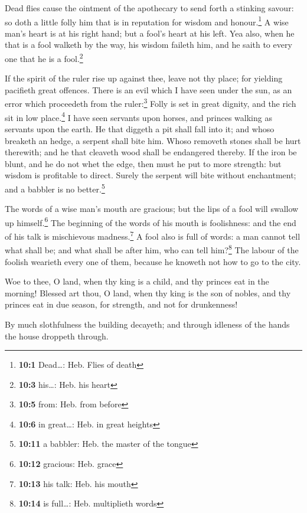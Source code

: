  Dead flies cause the ointment of the apothecary to send
forth a stinking savour: so doth a little folly him that is in
reputation for wisdom and honour.\footnote{\textbf{10:1} Dead\ldots:
  Heb. Flies of death}  A wise man's heart is at his right
hand; but a fool's heart at his left.  Yea also, when he
that is a fool walketh by the way, his wisdom faileth him, and he saith
to every one that he is a fool.\footnote{\textbf{10:3} his\ldots: Heb.
  his heart}

 If the spirit of the ruler rise up against thee, leave
not thy place; for yielding pacifieth great offences. 
There is an evil which I have seen under the sun, as an error which
proceedeth from the ruler:\footnote{\textbf{10:5} from: Heb. from before}
 Folly is set in great dignity, and the rich sit in low
place.\footnote{\textbf{10:6} in great\ldots: Heb. in great heights}
 I have seen servants upon horses, and princes walking as
servants upon the earth.  He that diggeth a pit shall fall
into it; and whoso breaketh an hedge, a serpent shall bite him.
 Whoso removeth stones shall be hurt therewith; and he
that cleaveth wood shall be endangered thereby.  If the
iron be blunt, and he do not whet the edge, then must he put to more
strength: but wisdom is profitable to direct.  Surely the
serpent will bite without enchantment; and a babbler is no
better.\footnote{\textbf{10:11} a babbler: Heb. the master of the tongue}

 The words of a wise man's mouth are gracious; but the
lips of a fool will swallow up himself.\footnote{\textbf{10:12}
  gracious: Heb. grace}  The beginning of the words of
his mouth is foolishness: and the end of his talk is mischievous
madness.\footnote{\textbf{10:13} his talk: Heb. his mouth}
 A fool also is full of words: a man cannot tell what
shall be; and what shall be after him, who can tell him?\footnote{\textbf{10:14}
  is full\ldots: Heb. multiplieth words}  The labour of
the foolish wearieth every one of them, because he knoweth not how to go
to the city.

 Woe to thee, O land, when thy king is a child, and thy
princes eat in the morning!  Blessed art thou, O land,
when thy king is the son of nobles, and thy princes eat in due season,
for strength, and not for drunkenness!

 By much slothfulness the building decayeth; and through
idleness of the hands the house droppeth through.

